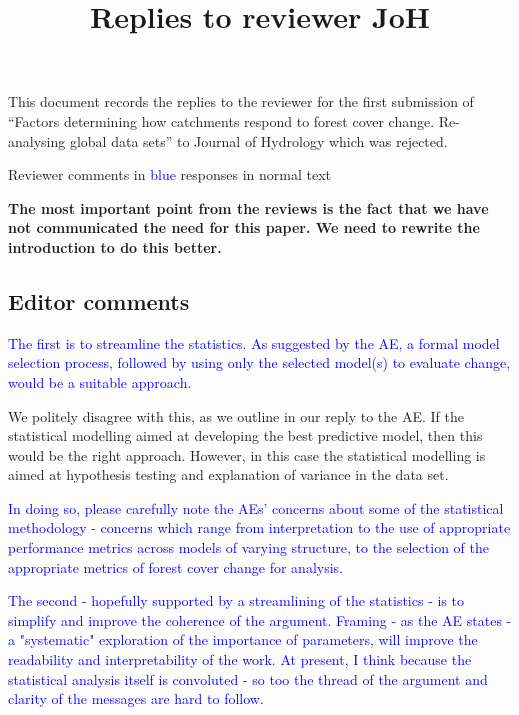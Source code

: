 \documentclass[]{elsarticle} %
\begin{document}
\begin{frontmatter}

  \title{Replies to reviewer JoH}
    \author[]{}
  
      
  \begin{abstract}
  
  \end{abstract}
  
 \end{frontmatter}

This document records the replies to the reviewer for the first submission of ``Factors determining how catchments respond to forest cover change. Re-analysing global data sets'' to Journal of Hydrology which was rejected.

Reviewer comments in \textcolor{blue}{blue} responses in normal text

\textbf{The most important point from the reviews is the fact that we have not communicated the need for this paper. We need to rewrite the introduction to do this better.}

\hypertarget{editor-comments}{%
\subsection{Editor comments}\label{editor-comments}}

\textcolor{blue}{The first is to streamline the statistics.  As suggested by the AE, a formal model selection process, followed by using only the selected model(s) to evaluate change, would be a suitable approach.}

We politely disagree with this, as we outline in our reply to the AE. If the statistical modelling aimed at developing the best predictive model, then this would be the right approach. However, in this case the statistical modelling is aimed at hypothesis testing and explanation of variance in the data set.

\textcolor{blue}{In doing so, please carefully note the AEs' concerns about some of the statistical methodology - concerns which range from interpretation to the use of appropriate performance metrics across models of varying structure, to the selection of the appropriate metrics of forest cover change for analysis.}

\textcolor{blue}{The second - hopefully supported by a streamlining of the statistics - is to simplify and improve the coherence of the argument.  Framing - as the AE states - a "systematic" exploration of the importance of parameters, will improve the readability and interpretability of the work.  At present, I think because the statistical analysis itself is convoluted - so too the thread of the argument and clarity of the messages are hard to follow.}
\end{document}
